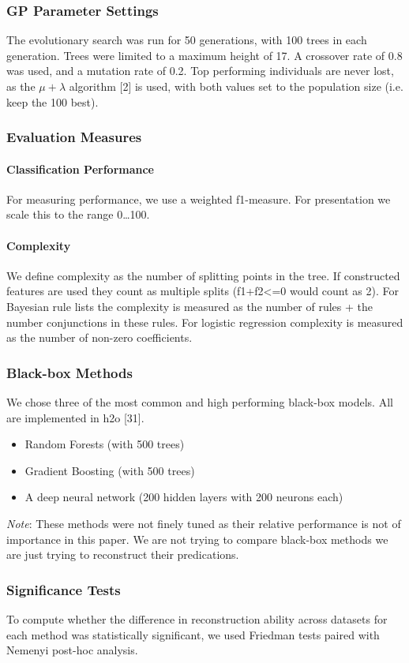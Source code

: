 \subsubsection{GP Parameter Settings}
The evolutionary search was run for 50 generations, with 100 trees in each generation. Trees were limited to a maximum height of 17. A crossover rate of 0.8 was used, and a mutation rate of 0.2. Top performing individuals are never lost, as the $\mu + \lambda$ algorithm [2] is used, with both values set to the population size (i.e. keep the 100 best).
\subsubsection{Evaluation Measures}
\paragraph{Classification Performance}
For measuring performance, we use a weighted f1-measure. For presentation we scale this to the range 0\ldots100.
\paragraph{Complexity}
We define complexity as the number of splitting points in the tree. If constructed features are used they count as multiple splits (f1+f2<=0 would count as 2). For Bayesian rule lists the complexity is measured as the number of rules + the number conjunctions in these rules. For logistic regression complexity is measured as the number of non-zero coefficients.
\subsubsection{Black-box Methods}
We chose three of the most common and high performing black-box models. All are implemented in h2o [31].
\begin{itemize}
\item Random Forests (with 500 trees)
\item Gradient Boosting (with 500 trees)
\item A deep neural network (200 hidden layers with 200 neurons each)
\end{itemize}
\textit{Note}: These methods were not finely tuned as their relative performance is not of importance in this paper. We are not trying to compare black-box methods we are just trying to reconstruct their predications.
\subsubsection{Significance Tests}
To compute whether the difference in reconstruction ability across datasets for each method was statistically significant, we used Friedman tests paired with Nemenyi post-hoc analysis.

